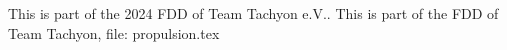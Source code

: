 This is part of the 2024 FDD of Team Tachyon e.V..
This is part of the FDD of Team Tachyon, file: propulsion.tex
